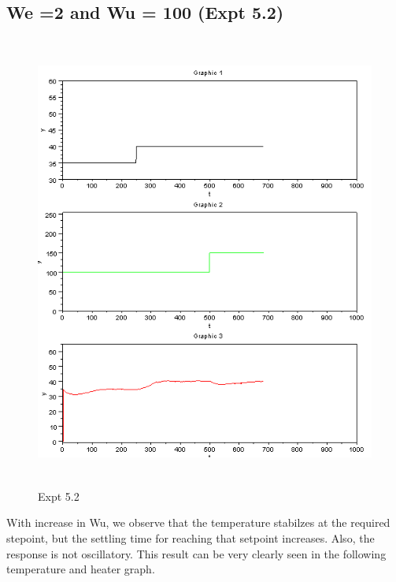 \subsection{We =2 and Wu = 100 (Expt 5.2) }
\begin{figure}[H]
  \includegraphics[width=12cm, height=15cm]{mpc/5_2.PNG}
  \caption{Expt 5.2}
\end{figure}
With increase in Wu, we observe that the temperature stabilzes at the required stepoint, but the settling time for reaching that setpoint increases. Also, the response is not oscillatory. This result can be very clearly seen in the following temperature and heater graph.

